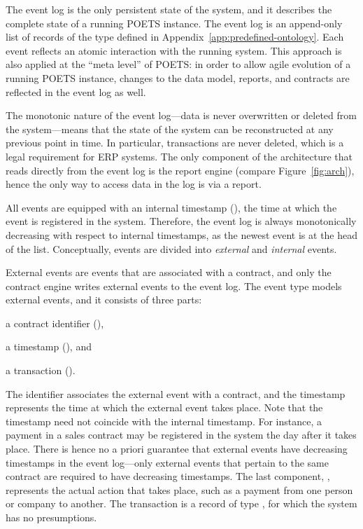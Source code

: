 The event log is the only persistent state of the system, and it
describes the complete state of a running POETS instance. The event log
is an append-only list of records of the type 
defined in Appendix~\ref{app:predefined-ontology}. Each event reflects an
atomic interaction with the running system. This approach is also
applied at the ``meta level'' of POETS: in order to allow agile
evolution of a running POETS instance, changes to the data model,
reports, and contracts are reflected in the event log as well.

The monotonic nature of the event log---data is never overwritten or
deleted from the system---means that the state of the system can be
reconstructed at any previous point in time. In particular,
transactions are never deleted, which is a legal requirement for ERP
systems. The only component of the architecture that reads directly
from the event log is the report engine (compare Figure~\ref{fig:arch}),
hence the only way to access data in the log is via a report.

All events are equipped with an internal timestamp
(), the time at which the event is
registered in the system. Therefore, the event log is always
monotonically decreasing with respect to internal timestamps, as the
newest event is at the head of the list.  Conceptually, events are
divided into \emph{external} and \emph{internal} events.

External events are events that are associated with a contract, and
only the contract engine writes external events to the event log. The
event type  models external events, and
it consists of three parts:
\begin{inparaenum}[(i)]
\item a contract identifier (),
\item a timestamp (), and
\item a transaction ().
\end{inparaenum}
The identifier associates the external event with a contract, and the
timestamp represents the time at which the external event takes
place. Note that the timestamp need not coincide with the internal
timestamp. For instance, a payment in a sales contract may be
registered in the system the day after it takes place. There is hence
no a priori guarantee that external events have decreasing
timestamps in the event log---only external events that pertain to the
same contract are required to have decreasing timestamps. The last
component, , represents the actual action that
takes place, such as a payment from one person or company to
another. The transaction is a record of type ,
for which the system has no presumptions.

